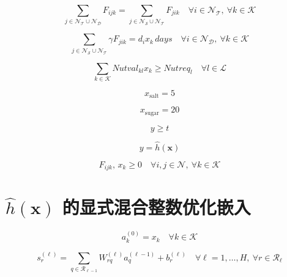 \documentclass[11pt]{ctexart}
\begin{document}
\begin{equation}
\sum_{j \in \mathcal N_{\mathcal T}\cup\mathcal N_{\mathcal D}} F_{ijk}
=
\sum_{j \in \mathcal N_{\mathcal S}\cup\mathcal N_{\mathcal T}} F_{jik}
\quad \forall i \in \mathcal N_{\mathcal T},\ \forall k \in \mathcal K
\tag{6b}
\end{equation}

\begin{equation}
\sum_{j \in \mathcal N_{\mathcal S} \cup \mathcal N_{\mathcal T}} \gamma F_{jik}
= d_i x_k \, days
\quad \forall i \in \mathcal N_{\mathcal D},\ \forall k \in \mathcal K
\tag{6c}
\end{equation}

\begin{equation}
\sum_{k \in \mathcal K} Nutval_{kl} x_k \ge Nutreq_l
\quad \forall l \in \mathcal L
\tag{6d}
\end{equation}

\begin{equation}
x_{\mathrm{salt}} = 5
\tag{6e}
\end{equation}

\begin{equation}
x_{\mathrm{sugar}} = 20
\tag{6f}
\end{equation}

\begin{equation}
y \ge t
\tag{6g}
\end{equation}

\begin{equation}
y = \hat h(\boldsymbol{x})
\tag{6h}
\end{equation}

\begin{equation}
F_{ijk},\, x_k \ge 0
\quad \forall i,j \in \mathcal N,\ \forall k \in \mathcal K
\tag{6i}
\end{equation}

\section*{$\hat h(\boldsymbol{x})$ 的显式混合整数优化嵌入}
\begin{equation}
a_k^{(0)} = x_k
\quad \forall k \in \mathcal K
\tag{Emb-a}
\end{equation}

\begin{equation}
s_r^{(\ell)} =
\sum_{q \in \mathcal R_{\ell-1}} W_{rq}^{(\ell)} a_q^{(\ell-1)} + b_r^{(\ell)}
\quad \forall \ell=1,\dots,H,\ \forall r \in \mathcal R_\ell
\tag{Emb-b}
\end{equation}
\end{document}
